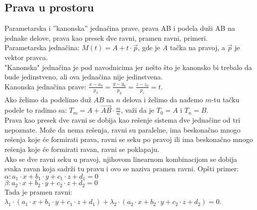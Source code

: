 \documentclass[12pt]{article}
\newcommand{\vek}[1]{\overrightarrow{#1}}
\begin{document}
\subsection{Prava u prostoru}
Parametarska i ”kanonska” jednačina prave, prava AB i
podela duži AB na jednake delove, prava kao presek dve
ravni, pramen ravni, primeri.
\\[1cm]
Parametarska jednačina: $M(t)=A+t\cdot\vek{p}$,
gde je $A$ tačka na pravoj, a $\vek{p}$ je vektor
pravca.\\
"Kanonska" jednačina je pod navodnicima jer nešto što je kanonsko bi
trebalo da bude jedinstveno, ali ova jednačina nije jedinstvena.\\
Kanonska jednačina prave: $\frac{x-x_0}{p_x}=\frac{y-y_0}{p_y}=\frac{z-z_0}{p_z}=t$.\\
Ako želimo da podelimo duž $AB$ na $n$ delova i
želimo da nađemo $m$-tu tačku podele to radimo sa:
$T_m=A+\vek{AB}\cdot\frac{m}{n}$, važi da je
$T_0=A$ i $T_n=B$.\\
Prava kao presek dve ravni se dobija kao rešenje sistema
dve jednačine od tri nepoznate. Može da nema rešenja, ravni su paralelne,
ima beskonačno mnogo rešenja koje će formirati prava, ravni se seku po pravoj ili
ima beskonačno mnogo rešenja koje će formirati ravan, ravni se poklapaju.\\
Ako se dve ravni seku u pravoj, njihovom linearnom kombinacijom
se dobija svaka ravan koja sadrži tu pravu i ovo se naziva
pramen ravni. Opšti primer:\\
$\alpha: a_1\cdot x+b_1\cdot y+c_1\cdot z+d_1=0$\\
$\beta: a_2\cdot x+b_2\cdot y+c_2\cdot z+d_2=0$\\
Tada je pramen ravni:\\
$\lambda_1\cdot(a_1\cdot x+b_1\cdot y+c_1\cdot z+d_1)+\lambda_2\cdot (a_2\cdot x+b_2\cdot y+c_2\cdot z+d_2)=0$.
\par
\end{document}
